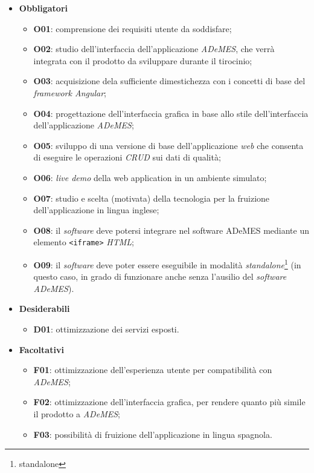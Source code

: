 \begin{itemize}
    \item \textbf{Obbligatori}
        \begin{itemize}
            \item \textbf{O01}: comprensione dei requisiti utente da soddisfare;
            \item \textbf{O02}: studio dell'interfaccia dell'applicazione \textit{ADeMES}, che verrà integrata con il prodotto da sviluppare durante il tirocinio;
            \item \textbf{O03}: acquisizione dela sufficiente dimestichezza con i concetti di base del \textit{framework Angular};
            \item \textbf{O04}: progettazione dell'interfaccia grafica in base allo stile dell'interfaccia dell'applicazione \textit{ADeMES};
            \item \textbf{O05}: sviluppo di una versione di base dell'applicazione \textit{web} che consenta di eseguire le operazioni \textit{CRUD} sui dati di qualità;  
            \item \textbf{O06}: \textit{live demo} della web application in un ambiente simulato;
            \item \textbf{O07}: studio e scelta (motivata) della tecnologia per la fruizione dell'applicazione in lingua inglese;
            \item \textbf{O08}: il \textit{software} deve potersi integrare nel software ADeMES mediante un elemento \texttt{<iframe>} \textit{HTML};
            \item \textbf{O09}: il \textit{software} deve poter essere eseguibile in modalità \textit{standalone}\footnote{\gls{standalone}} (in questo caso, in grado di funzionare anche senza l'ausilio del \textit{software ADeMES}).
        \end{itemize}
    \item \textbf{Desiderabili}
        \begin{itemize}
            \item \textbf{D01}: ottimizzazione dei servizi esposti.
        \end{itemize}
    \item \textbf{Facoltativi}
        \begin{itemize}
            \item \textbf{F01}: ottimizzazione dell'esperienza utente per compatibilità con \textit{ADeMES};
            \item \textbf{F02}: ottimizzazione dell'interfaccia grafica, per rendere quanto più simile il prodotto a \textit{ADeMES};
            \item \textbf{F03}: possibilità di fruizione dell'applicazione in lingua spagnola.
        \end{itemize}
\end{itemize}



